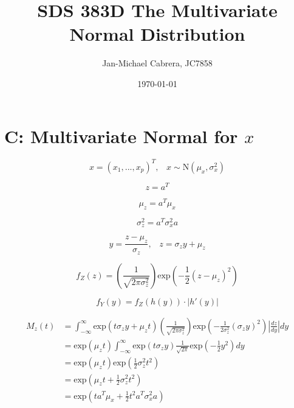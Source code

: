 \documentclass[12pt]{article}
\begin{document}
    \title{SDS 383D The Multivariate Normal Distribution}
    \author{Jan-Michael Cabrera, JC7858}
    \date{\today}
    \maketitle

    \section*{C: Multivariate Normal for $x$}

        \begin{equation}
            x = (x_1,...,x_p)^T, \hspace{10pt} x\sim\text{N}(\mu_x, \sigma_x^2)
        \end{equation}

        \begin{equation}
            z = a^T
        \end{equation}

        \begin{equation}
            \mu_z = a^T \mu_x
        \end{equation}

        \begin{equation}
            \sigma_z^2 = a^T \sigma_x^2 a
        \end{equation}

        \begin{equation}
            y = \frac{z - \mu_z}{\sigma_z}, \hspace{10pt} z = \sigma_z y + \mu_z
        \end{equation}

        \begin{equation}
            f_Z(z) = \left( \frac{1}{\sqrt{2 \pi \sigma_z^2}}\right) \text{exp}\left ( -\frac{1}{2} (z - \mu_z)^2\right)
        \end{equation}

        \begin{equation}
            f_Y(y) = f_Z(h(y)) \cdot |h'(y)|
        \end{equation}

        \begin{align}
            M_z(t) &= \int_{-\infty}^{\infty} \text{exp}(t \sigma_z y + \mu_z t) \left( \frac{1}{\sqrt{2 \pi \sigma_z^2}}\right) \text{exp}\left ( -\frac{1}{2 \sigma_z^2} (\sigma_z y)^2\right) \left | \frac{dz}{dy}\right | dy \\
            & = \text{exp}(\mu_z t) \int_{-\infty}^{\infty} \text{exp}(t \sigma_z y) \frac{1}{\sqrt{2 \pi}}\text{exp}\left( - \frac{1}{2} y^2 \right) dy \\
            &= \text{exp}(\mu_z t) \text{exp}\left ( \frac{1}{2} \sigma_z^2 t^2\right) \\
            & = \text{exp}\left ( \mu_z t + \frac{1}{2} \sigma_z^2 t^2\right) \\
            &= \text{exp}\left( t a^T \mu_x + \frac{1}{2}t^2 a^T \sigma_x^2 a\right)
        \end{align}
\end{document}
